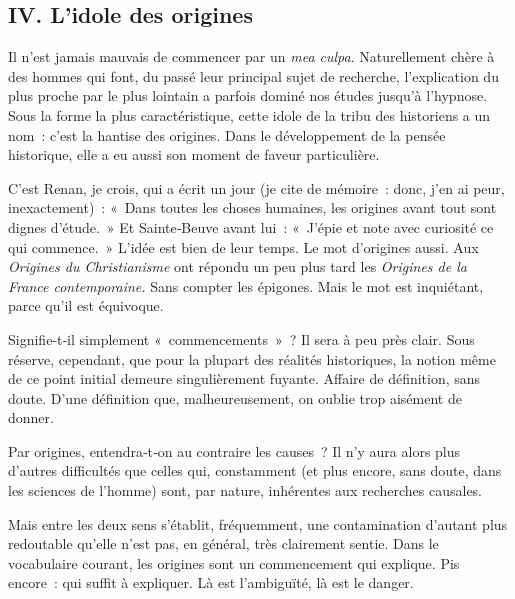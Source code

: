 \documentclass[french,twoside]{book} %
\newcommand{\astermono}{\medskip\centerline{\color{rubric}\large\selectfont{\syms ✻}}\medskip\par}%
\begin{document}
\subsection[{IV. L’idole des origines}]{IV. L’idole des origines}
\noindent Il n’est jamais mauvais de commencer par un \emph{mea culpa}. Naturellement chère à des hommes qui font, du passé leur principal sujet de recherche, l’explication du plus proche par le plus lointain a parfois dominé nos études jusqu’à l’hypnose. Sous la forme la plus caractéristique, cette idole de la tribu des historiens a un nom : c’est la hantise des origines. Dans le développement de la pensée historique, elle a eu aussi son moment de faveur particulière.\par
\label{p6} C’est Renan, je crois, qui a écrit un jour (je cite de mémoire : donc, j’en ai peur, inexactement) : « Dans toutes les choses humaines, les origines avant tout sont dignes d’étude. » Et Sainte‑Beuve avant lui : « J’épie et note avec curiosité ce qui commence. » L’idée est bien de leur temps. Le mot d’origines aussi. Aux \emph{Origines du Christianisme} ont répondu un peu plus tard les \emph{Origines de la France contemporaine.} Sans compter les épigones. Mais le mot est inquiétant, parce qu’il est équivoque.\par
Signifie‑t‑il simplement « commencements » ? Il sera à peu près clair. Sous réserve, cependant, que pour la plupart des réalités historiques, la notion même de ce point initial demeure singulièrement fuyante. Affaire de définition, sans doute. D’une définition que, malheureusement, on oublie trop aisément de donner.\par
Par origines, entendra‑t‑on au contraire les causes ? Il n’y aura alors plus d’autres difficultés que celles qui, constamment (et plus encore, sans doute, dans les sciences de l’homme) sont, par nature, inhérentes aux recherches causales.\par
Mais entre les deux sens s’établit, fréquemment, une contamination d’autant plus redoutable qu’elle n’est pas, en général, très clairement sentie. Dans le vocabulaire courant, les origines sont un commencement qui explique. Pis encore : qui suffit à expliquer. Là est l’ambiguïté, là est le danger.\par

\astermono
\end{document}
